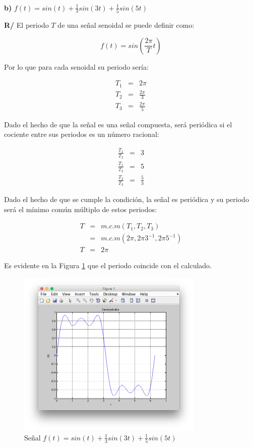 \documentclass[a4paper]{article}
\begin{document}
$\,$

\textbf{b)} $f(t) = sin(t) + \frac{1}{3}sin(3t) + \frac{1}{5}sin(5t)$

\textbf{R/} El periodo $T$ de una señal senoidal se puede definir como:

$$f(t) = sin\left(\frac{2\pi}{T}t\right)$$

Por lo que para cada senoidal su periodo sería:

\begin{eqnarray*}
T_1 &=& 2\pi\\
T_2 &=& \frac{2\pi}{3}\\
T_3 &=& \frac{2\pi}{5}
\end{eqnarray*}

Dado el hecho de que la señal es una señal compuesta, será periódica si el cociente entre sus periodos es un número racional:

\begin{eqnarray*}
\frac{T_1}{T_2} &=& 3\\
\frac{T_1}{T_2} &=& 5\\
\frac{T_2}{T_3} &=& \frac{5}{3}
\end{eqnarray*}

Dado el hecho de que se cumple la condición, la señal es periódica y su periodo será el mínimo común múltiplo de estos periodos:

\begin{eqnarray*}
T &=& m.c.m(T_1,T_2,T_3)\\
&=& m.c.m(2 \pi,2\pi3^{-1},2\pi5^{-1})\\
T &=& 2\pi
\end{eqnarray*}

Es evidente en la Figura \ref{fig_5b} que el periodo coincide con el calculado.

\begin{figure}[!t]
\centering
\includegraphics[width=3.5in]{imgs/5b.png}
\caption{Señal $f(t) = sin(t) + \frac{1}{3}sin(3t) + \frac{1}{5}sin(5t)$}
\label{fig_5b}
\end{figure}
\end{document}
